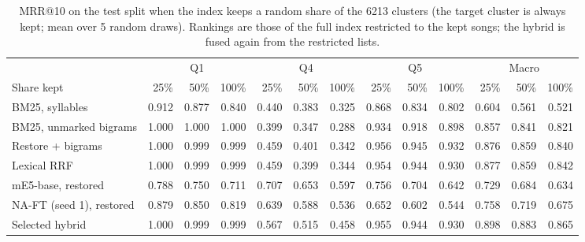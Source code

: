 \begin{table}[t]
\centering
\caption{MRR@10 on the test split when the index keeps a random share of the 6213 clusters (the target
cluster is always kept; mean over 5 random draws). Rankings are those of the full index restricted to the
kept songs; the hybrid is fused again from the restricted lists.}
\label{tab:catalogue}
\scriptsize
\setlength{\tabcolsep}{3.2pt}
\begin{tabular}{@{}l rrr rrr rrr rrr@{}}
\toprule
 & \multicolumn{3}{c}{Q1} & \multicolumn{3}{c}{Q4} & \multicolumn{3}{c}{Q5} & \multicolumn{3}{c}{Macro} \\
\cmidrule(lr){2-4} \cmidrule(lr){5-7} \cmidrule(lr){8-10} \cmidrule(lr){11-13}
Share kept & 25\% & 50\% & 100\% & 25\% & 50\% & 100\% & 25\% & 50\% & 100\% & 25\% & 50\% & 100\% \\
\midrule
BM25, syllables & 0.912 & 0.877 & 0.840 & 0.440 & 0.383 & 0.325 & 0.868 & 0.834 & 0.802 & 0.604 & 0.561 & 0.521 \\
BM25, unmarked bigrams & 1.000 & 1.000 & 1.000 & 0.399 & 0.347 & 0.288 & 0.934 & 0.918 & 0.898 & 0.857 & 0.841 & 0.821 \\
Restore + bigrams & 1.000 & 0.999 & 0.999 & 0.459 & 0.401 & 0.342 & 0.956 & 0.945 & 0.932 & 0.876 & 0.859 & 0.840 \\
Lexical RRF & 1.000 & 0.999 & 0.999 & 0.459 & 0.399 & 0.344 & 0.954 & 0.944 & 0.930 & 0.877 & 0.859 & 0.842 \\
mE5-base, restored & 0.788 & 0.750 & 0.711 & 0.707 & 0.653 & 0.597 & 0.756 & 0.704 & 0.642 & 0.729 & 0.684 & 0.634 \\
NA-FT (seed 1), restored & 0.879 & 0.850 & 0.819 & 0.639 & 0.588 & 0.536 & 0.652 & 0.602 & 0.544 & 0.758 & 0.719 & 0.675 \\
Selected hybrid & 1.000 & 0.999 & 0.999 & 0.567 & 0.515 & 0.458 & 0.955 & 0.944 & 0.930 & 0.898 & 0.883 & 0.865 \\
\bottomrule
\end{tabular}
\end{table}
